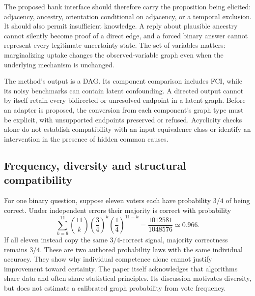 The proposed bank interface should therefore carry the proposition being
elicited: adjacency, ancestry, orientation conditional on adjacency, or a
temporal exclusion. It should also permit insufficient knowledge. A reply about
plausible ancestry cannot silently become proof of a direct edge, and a forced
binary answer cannot represent every legitimate uncertainty state. The set of
variables matters: marginalizing uptake changes the observed-variable graph
even when the underlying mechanism is unchanged.

The method's output is a DAG. Its component comparison includes FCI, while its
noisy benchmarks can contain latent confounding. A directed output cannot by
itself retain every bidirected or unresolved endpoint in a latent graph. Before
an adapter is proposed, the conversion from each component's graph type must be
explicit, with unsupported endpoints preserved or refused. Acyclicity checks
alone do not establish compatibility with an input equivalence class or identify
an intervention in the presence of hidden common causes.
\citep{exec20_expert_averaging}

\subsection{Frequency, diversity and structural compatibility}
\label{exec20:expert-votes}

For one binary question, suppose eleven voters each have probability $3/4$ of
being correct. Under independent errors their majority is correct with
probability
\begin{equation}
 \sum_{k=6}^{11}\binom{11}{k}
       \left(\frac34\right)^k\left(\frac14\right)^{11-k}
 =\frac{1012581}{1048576}\simeq0.966.
 \label{exec20:expert-majority}
\end{equation}
If all eleven instead copy the same $3/4$-correct signal, majority correctness
remains $3/4$. These are two authored probability laws with the same individual
accuracy. They show why individual competence alone cannot justify improvement
toward certainty. The paper itself acknowledges that algorithms share data and
often share statistical principles. Its discussion motivates diversity, but
does not estimate a calibrated graph probability from vote frequency.
\citep{exec20_expert_averaging,exec20_expert_averaging_reference}

